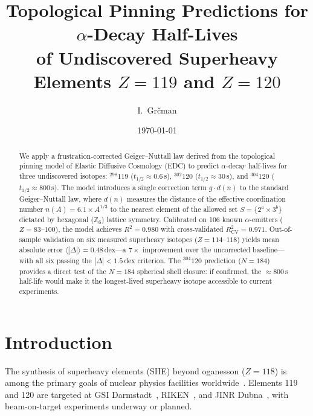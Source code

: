 \documentclass[12pt,a4paper,twocolumn]{revtex4-2}
\newcommand{\thalf}{t_{1/2}}
\newcommand{\dn}{d(n)}
\begin{document}
\title{Topological Pinning Predictions for $\alpha$-Decay Half-Lives\\
of Undiscovered Superheavy Elements $Z=119$ and $Z=120$}

\author{I.~Gr\v{c}man}

\date{\today}

\begin{abstract}
We apply a frustration-corrected Geiger--Nuttall law derived from
the topological pinning model of Elastic Diffusive Cosmology (EDC)
to predict $\alpha$-decay half-lives for three undiscovered isotopes:
${}^{298}119$ ($\thalf \approx 0.6$\,s),
${}^{302}120$ ($\thalf \approx 30$\,s), and
${}^{304}120$ ($\thalf \approx 800$\,s).
The model introduces a single correction term $g \cdot \dn$ to the
standard Geiger--Nuttall law, where $\dn$ measures the distance of
the effective coordination number $n(A) = 6.1 \times A^{1/3}$ to
the nearest element of the allowed set
$S = \{2^a \times 3^b\}$ dictated by hexagonal ($\mathbb{Z}_6$)
lattice symmetry.
Calibrated on 106 known $\alpha$-emitters ($Z = 83$--$100$), the
model achieves $R^2 = 0.980$ with cross-validated $R^2_{\mathrm{CV}}
= 0.971$.  Out-of-sample validation on six measured superheavy
isotopes ($Z = 114$--$118$) yields mean absolute error
$\langle|\Delta|\rangle = 0.48$\,dex---a $7\times$ improvement over
the uncorrected baseline---with all six passing the
$|\Delta| < 1.5$\,dex criterion.
The ${}^{304}120$ prediction ($N = 184$) provides a direct test of
the $N = 184$ spherical shell closure: if confirmed, the
$\approx 800$\,s half-life would make it the longest-lived
superheavy isotope accessible to current experiments.
\end{abstract}

\maketitle

\section{Introduction}
\label{sec:intro}

The synthesis of superheavy elements (SHE) beyond oganesson ($Z =
118$) is among the primary goals of nuclear physics
facilities worldwide~\cite{Oganessian2015,Nazarewicz2018}.
Elements 119 and 120 are targeted at GSI
Darmstadt~\cite{GSI2024}, RIKEN~\cite{RIKEN2024}, and JINR
Dubna~\cite{Dubna2024}, with beam-on-target experiments
underway or planned.
\end{document}
